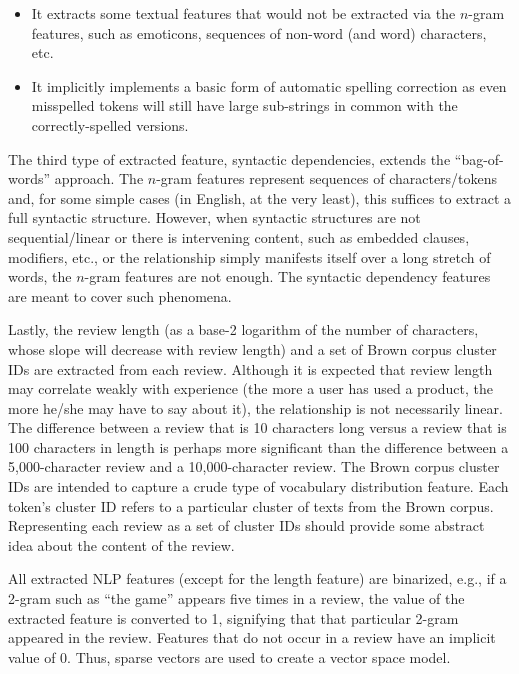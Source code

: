 \documentclass[9pt]{article}
\begin{document}
\begin{itemize}
\item It extracts some textual features that would not be extracted via the $n$-gram features, such as emoticons, sequences of non-word (and word) characters, etc.
\item It implicitly implements a basic form of automatic spelling correction as even misspelled tokens will still have large sub-strings in common with the correctly-spelled versions.
\end{itemize}

The third type of extracted feature, syntactic dependencies, extends the ``bag-of-words'' approach. The $n$-gram features represent sequences of characters/tokens and, for some simple cases (in English, at the very least), this suffices to extract a full syntactic structure. However, when syntactic structures are not sequential/linear or there is intervening content, such as embedded clauses, modifiers, etc., or the relationship simply manifests itself over a long stretch of words, the $n$-gram features are not enough. The syntactic dependency features are meant to cover such phenomena.

Lastly, the review length (as a base-2 logarithm of the number of characters, whose slope will decrease with review length) and a set of Brown corpus cluster IDs are extracted from each review. Although it is expected that review length may correlate weakly with experience (the more a user has used a product, the more he/she may have to say about it), the relationship is not necessarily linear. The difference between a review that is 10 characters long versus a review that is 100 characters in length is perhaps more significant than the difference between a 5,000-character review and a 10,000-character review. The Brown corpus cluster IDs are intended to capture a crude type of vocabulary distribution feature. Each token's cluster ID refers to a particular cluster of texts from the Brown corpus. Representing each review as a set of cluster IDs should provide some abstract idea about the content of the review.

All extracted NLP features (except for the length feature) are binarized, e.g., if a 2-gram such as ``the game'' appears five times in a review, the value of the extracted feature is converted to 1, signifying that that particular 2-gram appeared in the review. Features that do not occur in a review have an implicit value of 0. Thus, sparse vectors are used to create a vector space model.
\end{document}
